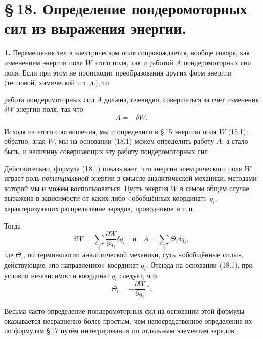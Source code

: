 \documentclass[a4paper,12pt]{article}
\begin{document}
\section*{\S\,18. Определение пондеромоторных сил из выражения энергии.}


\textbf{1.} Перемещение тел в электрическом поле сопровождается,
вообще говоря, как изменением энергии поля $W$ этого поля, так и
работой $A$ пондеромоторных сил поля. Если при этом не происходит
преобразования других форм энергии (тепловой, химической и т.\,д.), то


работа пондеромоторных сил $A$ должна, очевидно, совершаться за счёт
изменения $\delta W$ энергии поля, так что
\begin{equation}
    A = -\delta W.
    \tag{18.1}
\end{equation}

Исходя из этого соотношения, мы и определили в §\,15 энергию поля
$W$ (15.1); обратно, зная $W$, мы на основании (18.1) можем определить
работу $A$, а стало быть, и величину совершающих эту работу
пондеромоторных сил.

Действительно, формула (18.1) показывает, что энергия электрического
поля $W$ играет роль \textit{потенциальной} энергии в смысле
аналитической механики, методами которой мы и можем воспользоваться.
Пусть энергия $W$ в самом общем случае выражена в зависимости от
каких-либо «обобщённых координат» $q_i$, характеризующих распределение
зарядов, проводников и т.\,п.

Тогда
\begin{equation}
    \delta W = \sum_i \frac{\partial W}{\partial q_i}\delta q_i
    \quad\text{и}\quad
    A = \sum_i \Theta_i\delta q_i,
    \tag{18.2}
\end{equation}
где $\Theta_i$, по терминологии аналитической механики, суть
«обобщённые силы», действующие «по направлению» координат $q_i$.
Отсюда на основании (18.1), при условии независимости координат $q_i$
следует, что
\begin{equation}
    \Theta_i = -\frac{\partial W}{\partial q_i}\,^*.
    \tag{18.3}
\end{equation}

Весьма часто определение пондеромоторных сил на основании этой
формулы оказывается несравненно более простым, чем непосредственное
определение их по формулам §\,17 путём интегрирования по отдельным
элементам зарядов.
\end{document}
